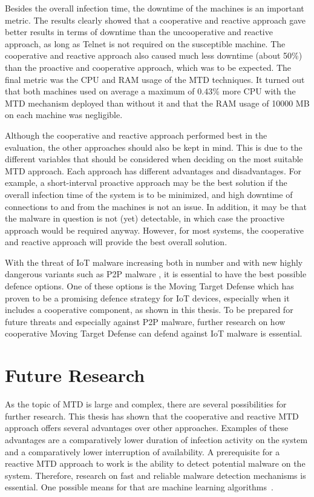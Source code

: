 Besides the overall infection time, the downtime of the machines is an important metric. The results clearly showed that a cooperative and reactive approach gave better results in terms of downtime than the uncooperative and reactive approach, as long as Telnet is not required on the susceptible machine. The cooperative and reactive approach also caused much less downtime (about 50\%) than the proactive and cooperative approach, which was to be expected. The final metric was the CPU and RAM usage of the MTD techniques. It turned out that both machines used on average a maximum of 0.43\% more CPU with the MTD mechanism deployed than without it and that the RAM usage of 10000 MB on each machine was negligible. 

Although the cooperative and reactive approach performed best in the evaluation, the other approaches should also be kept in mind. This is due to the different variables that should be considered when deciding on the most suitable MTD approach. Each approach has different advantages and disadvantages. For example, a short-interval proactive approach may be the best solution if the overall infection time of the system is to be minimized, and high downtime of connections to and from the machines is not an issue. In addition, it may be that the malware in question is not (yet) detectable, in which case the proactive approach would be required anyway.
However, for most systems, the cooperative and reactive approach will provide the best overall solution.

With the threat of IoT malware increasing both in number \cite{website:KasperskyAMalwareStory} and with new highly dangerous variants such as P2P malware \cite{website:trendMicroUncleanable}, it is essential to have the best possible defence options. One of these options is the Moving Target Defense which has proven to be a promising defence strategy for IoT devices, especially when it includes a cooperative component, as shown in this thesis. To be prepared for future threats and especially against P2P malware, further research on how cooperative Moving Target Defense can defend against IoT malware is essential.


\section{Future Research} \label{section:futureResearch}

As the topic of MTD is large and complex, there are several possibilities for further research. This thesis has shown that the cooperative and reactive MTD approach offers several advantages over other approaches. Examples of these advantages are a comparatively lower duration of infection activity on the system and a comparatively lower interruption of availability. A prerequisite for a reactive MTD approach to work is the ability to detect potential malware on the system. Therefore, research on fast and reliable malware detection mechanisms is essential. One possible means for that are machine learning algorithms~\cite{article:vonderAssen}.

